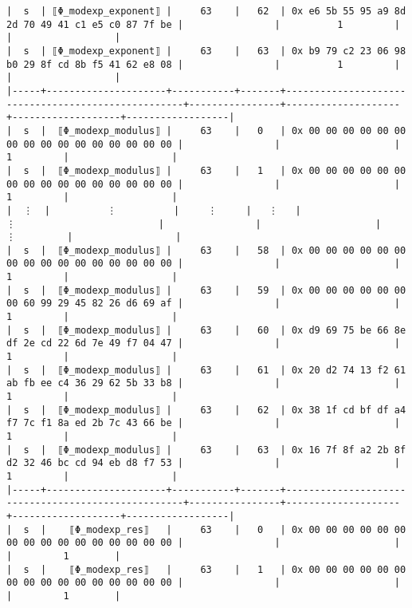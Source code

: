 \documentclass[varwidth=\maxdimen,margin=0.5cm,multi={verbatim}]{standalone}
\begin{document}
\begin{verbatim}
|  s  | ⟦Φ_modexp_exponent⟧ |     63    |   62  | 0x e6 5b 55 95 a9 8d 2d 70 49 41 c1 e5 c0 87 7f be |                |          1         |                   |                  |
|  s  | ⟦Φ_modexp_exponent⟧ |     63    |   63  | 0x b9 79 c2 23 06 98 b0 29 8f cd 8b f5 41 62 e8 08 |                |          1         |                   |                  |
|-----+---------------------+-----------+-------+----------------------------------------------------+----------------+--------------------+-------------------+------------------|
|  s  |  ⟦Φ_modexp_modulus⟧ |     63    |   0   | 0x 00 00 00 00 00 00 00 00 00 00 00 00 00 00 00 00 |                |                    |         1         |                  |
|  s  |  ⟦Φ_modexp_modulus⟧ |     63    |   1   | 0x 00 00 00 00 00 00 00 00 00 00 00 00 00 00 00 00 |                |                    |         1         |                  |
|  ⋮  |          ⋮          |     ⋮     |   ⋮   |                          ⋮                         |                |                    |         ⋮         |                  |
|  s  |  ⟦Φ_modexp_modulus⟧ |     63    |   58  | 0x 00 00 00 00 00 00 00 00 00 00 00 00 00 00 00 00 |                |                    |         1         |                  |
|  s  |  ⟦Φ_modexp_modulus⟧ |     63    |   59  | 0x 00 00 00 00 00 00 00 60 99 29 45 82 26 d6 69 af |                |                    |         1         |                  |
|  s  |  ⟦Φ_modexp_modulus⟧ |     63    |   60  | 0x d9 69 75 be 66 8e df 2e cd 22 6d 7e 49 f7 04 47 |                |                    |         1         |                  |
|  s  |  ⟦Φ_modexp_modulus⟧ |     63    |   61  | 0x 20 d2 74 13 f2 61 ab fb ee c4 36 29 62 5b 33 b8 |                |                    |         1         |                  |
|  s  |  ⟦Φ_modexp_modulus⟧ |     63    |   62  | 0x 38 1f cd bf df a4 f7 7c f1 8a ed 2b 7c 43 66 be |                |                    |         1         |                  |
|  s  |  ⟦Φ_modexp_modulus⟧ |     63    |   63  | 0x 16 7f 8f a2 2b 8f d2 32 46 bc cd 94 eb d8 f7 53 |                |                    |         1         |                  |
|-----+---------------------+-----------+-------+----------------------------------------------------+----------------+--------------------+-------------------+------------------|
|  s  |    ⟦Φ_modexp_res⟧   |     63    |   0   | 0x 00 00 00 00 00 00 00 00 00 00 00 00 00 00 00 00 |                |                    |                   |         1        |
|  s  |    ⟦Φ_modexp_res⟧   |     63    |   1   | 0x 00 00 00 00 00 00 00 00 00 00 00 00 00 00 00 00 |                |                    |                   |         1        |

\end{verbatim}
\end{document}
